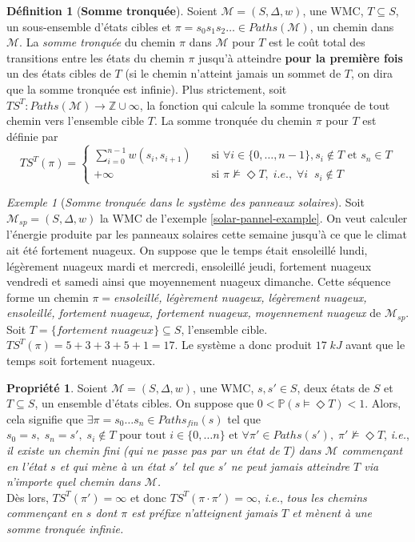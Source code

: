 \documentclass[12pt,a4paper]{report}
\theoremstyle{definition}%
\newtheorem{definition}{Définition}[chapter]
\newtheorem{propriete}{Propriété}[chapter]
\theoremstyle{remark}
\newtheorem{example}{Exemple}[chapter]
\newcommand{\ie}{\textit{i.e.}, }
\newcommand{\pr}{\mathbb{P}}
\begin{document}
\begin{definition}[\textbf{Somme tronquée}]
	Soient $\mathcal{M} = (S, \Delta, w)$, une WMC, $T \subseteq S$, un sous-ensemble d'états cibles et $\pi = s_0s_1s_2 \dots \in Paths(\mathcal{M})$, un chemin dans $\mathcal{M}$. La \textit{somme tronquée} du chemin $\pi$ dans $\mathcal{M}$ pour $T$ est le coût total des transitions entre les états du chemin $\pi$ jusqu'à atteindre \textbf{pour la première fois} un des états cibles de $T$ (si le chemin n'atteint jamais un sommet de $T$, on dira que la somme tronquée est infinie).
	Plus strictement,
	soit $TS^T : Paths(\mathcal{M}) \rightarrow \mathbb{Z} \cup \infty$, la fonction qui calcule la somme tronquée de tout chemin vers l'ensemble cible $T$. La somme tronquée du chemin $\pi$ pour $T$ est définie par 
	\[
		TS^T(\pi) =
		\begin{cases}
			\sum_{i = 0}^{n-1} w(s_i, s_{i+1}) & \quad \text{si } \forall i \in \{0, \dots, n - 1\}, s_i \notin T \text{ et } s_n \in T \\
			+\infty & \quad \text{si } \pi \not \models \Diamond T,\; \ie \; \forall i \;\; s_i \notin T
		\end{cases}
	\]
\end{definition}

\begin{example}[\textit{Somme tronquée dans le système des panneaux solaires}]
	Soit $\mathcal{M}_{sp}=(S, \Delta, w)$ la WMC de l'exemple \ref{solar-pannel-example}. On veut calculer l'énergie produite par les panneaux solaires cette semaine jusqu'à ce que le climat ait été fortement nuageux. On suppose que le temps était ensoleillé lundi, légèrement nuageux mardi et mercredi, ensoleillé jeudi, fortement nuageux vendredi et samedi ainsi que moyennement nuageux dimanche. Cette séquence forme un chemin $\pi = $\textit{ensoleillé, légèrement nuageux, légèrement nuageux, ensoleillé, fortement nuageux, fortement nuageux, moyennement nuageux} de $\mathcal{M}_{sp}$. Soit $T = \{\textit{fortement nuageux}\} \subseteq S$, l'ensemble cible. $TS^T(\pi) = 5 + 3 + 3 + 5 + 1 = 17$. Le système a donc produit $17\; kJ$ avant que le temps soit fortement nuageux. 
\end{example}

\begin{propriete}\label{prop-ts}
	Soient $\mathcal{M} = (S, \Delta, w)$, une WMC, $s, s' \in S$, deux états de $S$ et $T \subseteq S$, un ensemble d'états cibles. On suppose que $0 < \pr(s \models \Diamond T) < 1$. Alors, cela signifie que $\exists \pi = s_0 \dots s_n \in Paths_{fin}(s)$ tel que $s_0 = s,\; s_n = s',\; s_i \notin T \text{ pour tout } i \in \{0, \dots n \} \text{ et } \forall \pi' \in Paths(s'), \; \pi' \not \models \Diamond T$, \ie \textit{il existe un chemin fini (qui ne passe pas par un état de $T$) dans $\mathcal{M}$ commençant en l'état $s$ et qui mène à un état $s'$ tel que $s'$ ne peut jamais atteindre $T$ via n'importe quel chemin dans $\mathcal{M}$.}\\ Dès lors, $TS^T(\pi') = \infty$ et donc $TS^T(\pi \cdot \pi') = \infty$, \ie \textit{tous les chemins commençant en $s$ dont $\pi$ est préfixe n'atteignent jamais $T$ et mènent à une somme tronquée infinie.}
\end{propriete}
\end{document}
